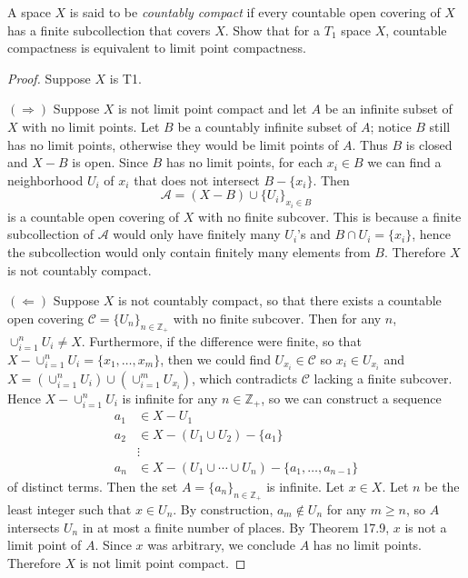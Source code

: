 \documentclass[11pt]{article}
\begin{document}
\begin{ex}{28.4}
  A space $X$ is said to be \emph{countably compact} if every countable open
  covering of $X$ has a finite subcollection that covers $X$. Show that for a
  $T_1$ space $X$, countable compactness is equivalent to limit point
  compactness.
\end{ex}
\begin{proof}
  Suppose $X$ is T1.

  $(\Longrightarrow)$ Suppose $X$ is not limit point compact and let $A$ be an
  infinite subset of $X$ with no limit points. Let $B$ be a countably infinite
  subset of $A$; notice $B$ still has no limit points, otherwise they would be
  limit points of $A$. Thus $B$ is closed and $X - B$ is open. Since $B$ has no
  limit points, for each $x_i \in B$ we can find a neighborhood $U_i$ of $x_i$
  that does not intersect $B - \{x_i\}$. Then
  \[ \mathcal{A} = (X - B) \cup \{U_i\}_{x_i \in B} \]
  is a countable open covering of $X$ with no finite subcover. This is because a
  finite subcollection of $\mathcal{A}$ would only have finitely many $U_i$'s
  and $B \cap U_i = \{x_i\}$, hence the subcollection would only contain
  finitely many elements from $B$. Therefore $X$ is not countably compact.

  $(\Longleftarrow)$ Suppose $X$ is not countably compact, so that there exists
  a countable open covering $\mathcal{C} = \{U_n\}_{n \in \mathbb{Z}_+}$ with no
  finite subcover. Then for any $n$, $\cup_{i = 1}^n U_i \neq X$. Furthermore,
  if the difference were finite, so that $X - \cup_{i = 1}^n U_i =
  \{x_1,\ldots,x_m\}$, then we could find $U_{x_i} \in \mathcal{C}$ so $x_i \in
  U_{x_i}$ and $X = (\cup_{i = 1}^n U_i) \cup (\cup_{i = 1}^m U_{x_i})$, which
  contradicts $\mathcal{C}$ lacking a finite subcover. Hence $X - \cup_{i = 1}^n
  U_i$ is infinite for any $n \in \mathbb{Z}_+$, so we can construct a sequence
  \begin{align*}
    a_1 &\in X - U_1 \\
    a_2 &\in X - (U_1 \cup U_2) - \{a_1\} \\
        &\vdots \\
    a_n &\in X - (U_1 \cup \cdots \cup U_n) - \{a_1, \ldots, a_{n-1}\}
  \end{align*}
  of distinct terms. Then the set $A = \{a_n\}_{n \in \mathbb{Z}_+}$ is
  infinite. Let $x \in X$. Let $n$ be the least integer such that $x \in U_n$.
  By construction, $a_m \not\in U_n$ for any $m \geq n$, so $A$ intersects $U_n$
  in at most a finite number of places. By Theorem 17.9, $x$ is not a limit
  point of $A$. Since $x$ was arbitrary, we conclude $A$ has no limit points.
  Therefore $X$ is not limit point compact.
\end{proof}
\end{document}
